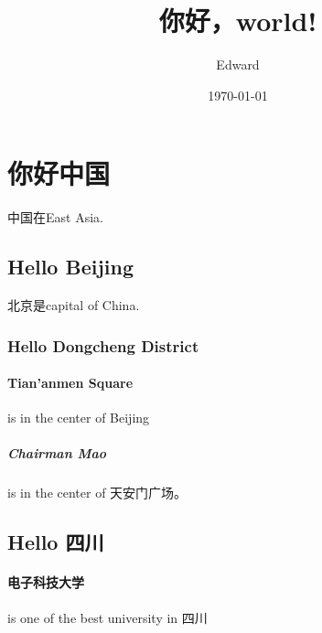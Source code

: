 \documentclass[UTF8]{ctexart}
\title{你好，world!}
\author{Edward}
\date{\today}
\begin{document}
\maketitle
\tableofcontents
\section{你好中国}
中国在East Asia.
\subsection{Hello Beijing}
北京是capital of China.
\subsubsection{Hello Dongcheng District}
\paragraph{Tian'anmen Square}
is in the center of Beijing
\subparagraph{Chairman Mao}
is in the center of 天安门广场。
\subsection{Hello 四川}
\paragraph{电子科技大学} is one of the best university in 四川
\end{document}
